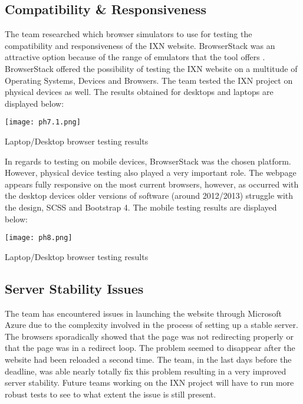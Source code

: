 \documentclass[fontsize=11pt]{extarticle}
\numberwithin{figure}{section} %
\begin{document}
\hypertarget{compatibility-responsiveness}{%
\subsection{Compatibility \&
Responsiveness}\label{compatibility-responsiveness}}

The team researched which browser simulators to use for testing the
compatibility and responsiveness of the IXN website. BrowserStack was an
attractive option because of the range of emulators that the tool offers
\cite{g6}. BrowserStack offered the possibility of testing the IXN
website on a multitude of Operating Systems, Devices and Browsers. The
team tested the IXN project on physical devices as well. The results
obtained for desktops and laptops are displayed below:

\begin{table}[H]
      \centering
      \texttt{[image: ph7.1.png]}
      \caption{Laptop/Desktop browser testing results}
 \end{table}

In regards to testing on mobile devices, BrowserStack was the chosen
platform. However, physical device testing also played a very important
role. The webpage appears fully responsive on the most current browsers,
however, as occurred with the desktop devices older versions of software
(around 2012/2013) struggle with the design, SCSS and Bootstrap 4. The
mobile testing results are displayed below:

\begin{table}[H]
      \centering
      \texttt{[image: ph8.png]}
      \caption{Laptop/Desktop browser testing results}
 \end{table}

\hypertarget{server-stability-issues}{%
\subsection{Server Stability Issues}\label{server-stability-issues}}

The team has encountered issues in launching the website through
Microsoft Azure due to the complexity involved in the process of setting
up a stable server. The browsers sporadically showed that the page was
not redirecting properly or that the page was in a redirect loop. The
problem seemed to disappear after the website had been reloaded a second
time. The team, in the last days before the deadline, was able nearly
totally fix this problem resulting in a very improved server stability.
Future teams working on the IXN project will have to run more robust
tests to see to what extent the issue is still present.
\end{document}
